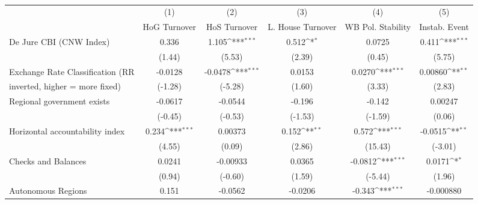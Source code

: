 \begin{table}[htbp]\centering
\def\sym#1{\ifmmode^{#1}\else\(^{#1}\)\fi}
\caption{\label{nccmultIndOLSDJ}}
\begin{tabular}{l*{5}{c}}
\toprule
                                        &\multicolumn{1}{c}{(1)}&\multicolumn{1}{c}{(2)}&\multicolumn{1}{c}{(3)}&\multicolumn{1}{c}{(4)}&\multicolumn{1}{c}{(5)}\\
                                        &\multicolumn{1}{c}{HoG Turnover}&\multicolumn{1}{c}{HoS Turnover}&\multicolumn{1}{c}{L. House Turnover}&\multicolumn{1}{c}{WB Pol. Stability}&\multicolumn{1}{c}{Instab. Event}\\
\midrule
De Jure CBI (CNW Index)                 &    0.336         &    1.105\sym{***}&    0.512\sym{*}  &   0.0725         &    0.411\sym{***}\\
                                        &   (1.44)         &   (5.53)         &   (2.39)         &   (0.45)         &   (5.75)         \\
\addlinespace
Exchange Rate Classification (RR        &  -0.0128         &  -0.0478\sym{***}&   0.0153         &   0.0270\sym{***}&  0.00860\sym{**} \\
inverted, higher = more fixed)          &  (-1.28)         &  (-5.28)         &   (1.60)         &   (3.33)         &   (2.83)         \\
\addlinespace
Regional government exists              &  -0.0617         &  -0.0544         &   -0.196         &   -0.142         &  0.00247         \\
                                        &  (-0.45)         &  (-0.53)         &  (-1.53)         &  (-1.59)         &   (0.06)         \\
\addlinespace
Horizontal accountability index         &    0.234\sym{***}&  0.00373         &    0.152\sym{**} &    0.572\sym{***}&  -0.0515\sym{**} \\
                                        &   (4.55)         &   (0.09)         &   (2.86)         &  (15.43)         &  (-3.01)         \\
\addlinespace
Checks and Balances                     &   0.0241         & -0.00933         &   0.0365         &  -0.0812\sym{***}&   0.0171\sym{*}  \\
                                        &   (0.94)         &  (-0.60)         &   (1.59)         &  (-5.44)         &   (1.96)         \\
\addlinespace
Autonomous Regions                      &    0.151         &  -0.0562         &  -0.0206         &   -0.343\sym{***}&-0.000880         \\

\end{tabular}
\end{table}
